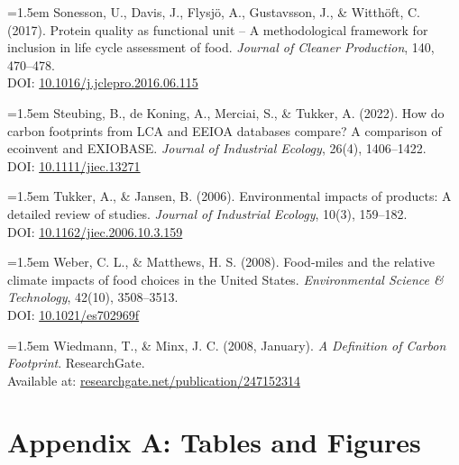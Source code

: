 \documentclass[12pt,a4paper]{article}%
\begin{document}
\vspace{0.5em}
{\small
\noindent
\parbox{\linewidth}{
\hangindent=1.5em
Sonesson, U., Davis, J., Flysjö, A., Gustavsson, J., \& Witthöft, C. (2017). Protein quality as functional unit – A methodological framework for inclusion in life cycle assessment of food. \textit{Journal of Cleaner Production}, 140, 470–478. \\
DOI: \href{https://doi.org/10.1016/j.jclepro.2016.06.115}{10.1016/j.jclepro.2016.06.115}
}
}

\vspace{0.5em}
{\small
\noindent
\parbox{\linewidth}{
\hangindent=1.5em
Steubing, B., de Koning, A., Merciai, S., \& Tukker, A. (2022). How do carbon footprints from LCA and EEIOA databases compare? A comparison of ecoinvent and EXIOBASE. \textit{Journal of Industrial Ecology}, 26(4), 1406–1422. \\
DOI: \href{https://doi.org/10.1111/jiec.13271}{10.1111/jiec.13271}
}
}

\vspace{0.5em}
{\small
\noindent
\parbox{\linewidth}{
\hangindent=1.5em
Tukker, A., \& Jansen, B. (2006). Environmental impacts of products: A detailed review of studies. \textit{Journal of Industrial Ecology}, 10(3), 159–182. \\
DOI: \href{https://doi.org/10.1162/jiec.2006.10.3.159}{10.1162/jiec.2006.10.3.159}
}
}

\vspace{0.5em}
{\small
\noindent
\parbox{\linewidth}{
\hangindent=1.5em
Weber, C. L., \& Matthews, H. S. (2008). Food-miles and the relative climate impacts of food choices in the United States. \textit{Environmental Science \& Technology}, 42(10), 3508–3513. \\
DOI: \href{https://doi.org/10.1021/es702969f}{10.1021/es702969f}
}
}

\vspace{0.5em}
{\small
\noindent
\parbox{\linewidth}{
\hangindent=1.5em
Wiedmann, T., \& Minx, J. C. (2008, January). \textit{A Definition of Carbon Footprint}. ResearchGate. \\
Available at: \href{https://www.researchgate.net/publication/247152314_A_Definition_of_Carbon_Footprint}{researchgate.net/publication/247152314}
}
}

\newpage
\appendix
\section*{Appendix A: Tables and Figures}
\end{document}
